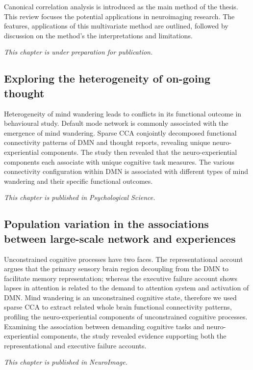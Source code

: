 Canonical correlation analysis is introduced as the main method of the thesis. This review focuses the potential applications in neuroimaging research. The features, applications of this multivariate method are outlined, followed by discussion on the method's the interpretations and limitations. 

\textit{This chapter is under preparation for publication. } 

\subsection*{Exploring the heterogeneity of on-going thought}
Heterogeneity of mind wandering leads to conflicts in its functional outcome in behavioural study. Default mode network is commonly associated with the emergence of mind wandering. Sparse CCA conjointly decomposed functional connectivity patterns of DMN and thought reports, revealing unique neuro-experiential components. The study then revealed that the neuro-experiential components each associate with unique cognitive task measures. The various connectivity configuration within DMN is associated with different types of mind wandering and their specific functional outcomes.

\textit{This chapter is published in Psychological Science.}

\subsection*{Population variation in the associations between large-scale network and experiences}
Unconstrained cognitive processes have two faces. The representational account argues that the primary sensory brain region decoupling from the DMN to facilitate memory representation; whereas the executive failure account shows lapses in attention is related to the demand to attention system and activation of DMN. Mind wandering is an unconstrained cognitive state, therefore we used sparse CCA to extract related whole brain functional connectivity patterns, profiling the neuro-experiential components of unconstrained cognitive processes. Examining the association between demanding cognitive tasks and neuro-experiential components, the study revealed evidence supporting both the representational and executive failure accounts.

\textit{This chapter is published in NeuroImage.}

